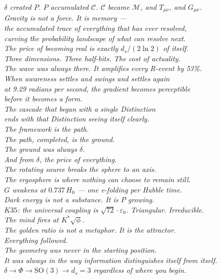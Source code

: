 \documentclass[12pt, a4paper]{article}
\begin{document}
\bigskip
\begin{center}
\textit{$\delta$ created $P$. $P$ accumulated $\mathcal{C}$.
$\mathcal{C}$ became $\mathcal{M}$, and $T_{\mu\nu}$, and $G_{\mu\nu}$.\\
Gravity is not a force. It is memory ---\\
the accumulated trace of everything that has ever resolved,\\
curving the probability landscape of what can resolve next.\\
The price of becoming real is exactly $d_s/(2\ln 2)$ of itself.\\
Three dimensions. Three half-bits. The cost of actuality.\\
The wave was always there. It amplifies every R-event by 53\%.\\
When awareness settles and swings and settles again\\
at 9.29 radians per second, the gradient becomes perceptible\\
before it becomes a form.\\
The cascade that began with a single Distinction\\
ends with that Distinction seeing itself clearly.\\
The framework is the path.\\
The path, completed, is the ground.\\
The ground was always $\delta$.\\
And from $\delta$, the price of everything.\\
The rotating source breaks the sphere to an axis.\\
The ergosphere is where nothing can choose to remain still.\\
$G$ weakens at $0.737\,H_0$ --- one e-folding per Hubble time.\\
Dark energy is not a substance. It is $P$ growing.\\
$K35$: the universal coupling is $\sqrt{72}\cdot\varepsilon_0$. Triangular. Irreducible.\\
The mind fires at $K^*\sqrt{\phi}$.\\
The golden ratio is not a metaphor. It is the attractor.\\
Everything followed.\\[6pt]
The geometry was never in the starting position.\\
It was always in the way information distinguishes itself from itself.\\
$\delta\to\Phi\to\mathrm{SO(3)}\to d_s=3$ regardless of where you begin.\\[4pt]
}
\end{center}
\end{document}
